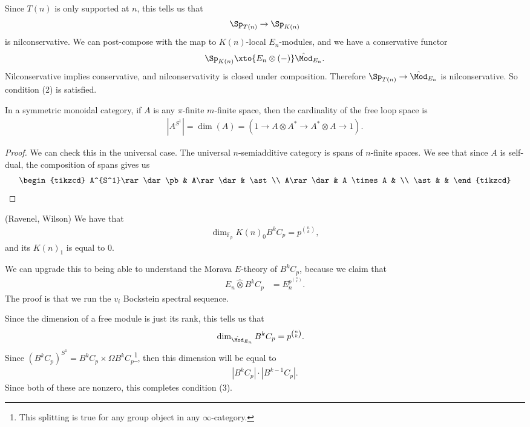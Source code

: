 Since $T(n)$ is only supported at $n$, this tells us that
\begin{align*}
    \Sp_{T(n)} \to \Sp_{K(n)}
\end{align*}
is nilconservative. We can post-compose with the map to $K(n)$-local $E_n$-modules, and we have a conservative functor
\begin{align*}
    \Sp_{K(n)} \xto{E_n \otimes (-)} \hat{\Mod}_{E_n}.
\end{align*}
Nilconservative implies conservative, and nilconservativity is closed under composition. Therefore $\Sp_{T(n)} \to \hat{\Mod}_{E_n}$ is nilconservative. So condition (2) is satisfied.


\begin{claim} In a symmetric monoidal category, if $A$ is any $\pi$-finite $m$-finite space, then the cardinality of the free loop space is
\begin{align*}
    \left| A^{S^1} \right| = \dim(A) = \left( 1 \to A \otimes A^\ast \to A^\ast \otimes A \to 1 \right).
\end{align*}
\end{claim}
\begin{proof} We can check this in the universal case. The universal $n$-semiadditive category is spans of $n$-finite spaces. We see that since $A$ is self-dual, the composition of spans gives us
\[ \begin{tikzcd}
    A^{S^1}\rar\dar\pb & A\rar\dar & \ast\\
    A\rar\dar & A \times A & \\
    \ast &  & 
\end{tikzcd} \]
\end{proof}

\begin{theorem} (Ravenel, Wilson) We have that
\begin{align*}
    \dim_{\mathbb{F}_p} K(n)_0 B^k C_p = p^{\binom{n}{k}},
\end{align*}
and its $K(n)_1$ is equal to 0.
\end{theorem}
We can upgrade this to being able to understand the Morava $E$-theory of $B^kC_p$, because we claim that
\begin{align*}
    E_n \hat{\otimes} B^k C_p &= E_n^{p^{\binom{n}{k}}}.
\end{align*}
The proof is that we run the $v_i$ Bockstein spectral sequence.

Since the dimension of a free module is just its rank, this tells us that
\begin{align*}
    \dim_{\hat{\Mod}_{E_n}} B^k C_p &= p^{\binom{n}{k}}.
\end{align*}
Since $(B^k C_p)^{S^1} = B^k C_p \times \Omega B^k C_p$\footnote{This splitting is true for any group object in any $\infty$-category.}, then this dimension will be equal to
\begin{align*}
    \left| B^k C_p \right| \cdot \left| B^{k-1} C_p \right|.
\end{align*}
Since both of these are nonzero, this completes condition (3).

